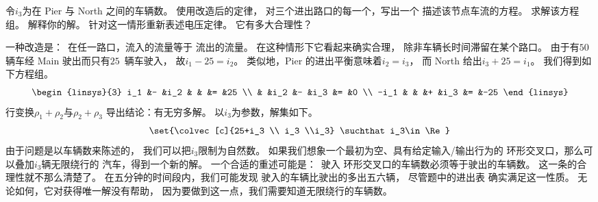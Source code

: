 \begin{exercises}
\begin{exparts}
         令$i_3$为在 Pier 与 North 之间的车辆数。
         使用改造后的定律，
         对三个进出路口的每一个，写出一个
         描述该节点车流的方程。
      \partsitem 
         求解该方程组。
      \partsitem
         解释你的解。
      \partsitem
         针对这一情形重新表述电压定律。
         它有多大合理性？
    \end{exparts}
    \begin{answer}
      \begin{exparts}
        \partsitem
           一种改造是：~在任一路口，流入的流量等于
           流出的流量。
           在这种情形下它看起来确实合理，
           除非车辆长时间滞留在某个路口。
        \partsitem
           由于有$50$辆车经 Main 驶出而只有$25$~辆车驶入，
           故$i_1-25=i_2$。
           类似地，Pier 的进出平衡意味着$i_2=i_3$，
           而 North 给出$i_3+25=i_1$。 
           我们得到如下方程组。
           \begin{equation*}
             \begin{linsys}{3}
               i_1  &-  &i_2  &   &     &=  &25  \\
                    &   &i_2  &-  &i_3  &=  &0   \\
              -i_1  &   &     &+  &i_3  &=  &-25
              \end{linsys}
           \end{equation*}
        \partsitem 
           行变换$\rho_1+\rho_2$与$\rho_2+\rho_3$
           导出结论：有无穷多解。
           以$i_3$为参数，解集如下。
           \begin{equation*}
             \set{\colvec[c]{25+i_3  \\ i_3  \\i_3} \suchthat i_3\in\Re}
           \end{equation*}
           由于问题是以车辆数来陈述的，
           我们可以把$i_3$限制为自然数。
        \partsitem
           如果我们想象一个最初为空、具有给定输入/输出行为的
           环形交叉口，那么可以叠加$i_3$辆无限绕行的
           汽车，得到一个新的解。
        \partsitem
           一个合适的重述可能是：~驶入
           环形交叉口的车辆数必须等于驶出的车辆数。
           这一条的合理性就不那么清楚了。
           在五分钟的时间段内，我们可能发现
           驶入的车辆比驶出的多出五六辆，
           尽管题中的进出表
           确实满足这一性质。
           无论如何，它对获得唯一解没有帮助，
           因为要做到这一点，我们需要知道无限绕行的车辆数。
      \end{exparts}
    \end{answer}

\end{exercises}
